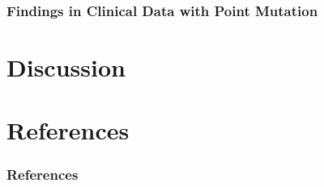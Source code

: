 \documentclass{beamer}
\begin{document}
    \begin{frame}
        \frametitle{Findings in Clinical Data with Point Mutation}
    \end{frame}

    \section{Discussion}

    \section{References}
    \begin{frame}[allowframebreaks]
        \frametitle{References}
        
        
    \end{frame}
\end{document}
